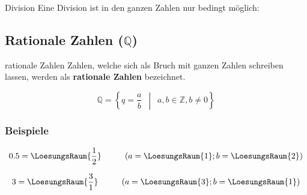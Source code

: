 \begin{bemerkung}{Division}{}
  Eine Division ist in den ganzen Zahlen nur bedingt möglich:
\end{bemerkung}



\newpage


\subsection{Rationale Zahlen ($\mathbb{Q}$)}

\begin{definition}{rationale Zahlen}{}
Zahlen, welche sich als Bruch mit ganzen Zahlen schreiben lassen,
werden als \textbf{rationale Zahlen} bezeichnet.


$$\mathbb{Q} =\left\{ q = \frac{a}{b} \,\,\, \middle| \,\,\, a,b \in
\mathbb{Z}, b \ne 0 \right\}$$
\end{definition}

\subsubsection{Beispiele}

$$0.5 = \LoesungsRaum{\frac12} \hspace{1cm} (a=\LoesungsRaum{1}; b=\LoesungsRaum{2})$$

$$3 = \LoesungsRaum{\frac31} \hspace{1cm} (a=\LoesungsRaum{3}; b=\LoesungsRaum{1})$$

